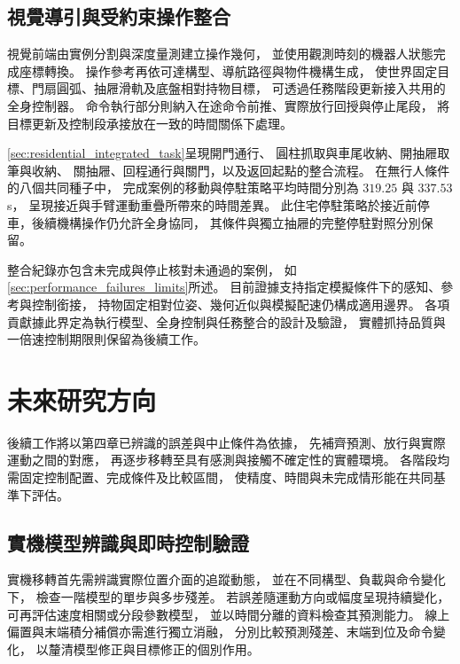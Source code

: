 \subsection{視覺導引與受約束操作整合}
\label{subsec:conclusion_visual_constrained_integration}

視覺前端由實例分割與深度量測建立操作幾何，
並使用觀測時刻的機器人狀態完成座標轉換。
操作參考再依可達構型、導航路徑與物件機構生成，
使世界固定目標、門扇圓弧、抽屜滑軌及底盤相對持物目標，
可透過任務階段更新接入共用的全身控制器。
命令執行部分則納入在途命令前推、實際放行回授與停止尾段，
將目標更新及控制段承接放在一致的時間關係下處理。

\cref{sec:residential_integrated_task}呈現開門通行、
圓柱抓取與車尾收納、開抽屜取筆與收納、
關抽屜、回程通行與關門，以及返回起點的整合流程。
在無行人條件的八個共同種子中，
完成案例的移動與停駐策略平均時間分別為 $319.25$ 與 $337.53$ s，
呈現接近與手臂運動重疊所帶來的時間差異。
此住宅停駐策略於接近前停車，後續機構操作仍允許全身協同，
其條件與獨立抽屜的完整停駐對照分別保留。

整合紀錄亦包含未完成與停止核對未通過的案例，
如\cref{sec:performance_failures_limits}所述。
目前證據支持指定模擬條件下的感知、參考與控制銜接，
持物固定相對位姿、幾何近似與模擬配速仍構成適用邊界。
各項貢獻據此界定為執行模型、全身控制與任務整合的設計及驗證，
實體抓持品質與一倍速控制期限則保留為後續工作。

\section{未來研究方向}
\label{sec:future_research_directions}

後續工作將以第四章已辨識的誤差與中止條件為依據，
先補齊預測、放行與實際運動之間的對應，
再逐步移轉至具有感測與接觸不確定性的實體環境。
各階段均需固定控制配置、完成條件及比較區間，
使精度、時間與未完成情形能在共同基準下評估。

\subsection{實機模型辨識與即時控制驗證}
\label{subsec:future_physical_identification_realtime}

實機移轉首先需辨識實際位置介面的追蹤動態，
並在不同構型、負載與命令變化下，
檢查一階模型的單步與多步殘差。
若誤差隨運動方向或幅度呈現持續變化，
可再評估速度相關或分段參數模型，
並以時間分離的資料檢查其預測能力。
線上偏置與末端積分補償亦需進行獨立消融，
分別比較預測殘差、末端到位及命令變化，
以釐清模型修正與目標修正的個別作用。

